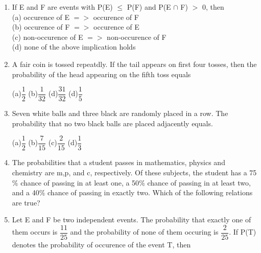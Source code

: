 \documentclass[journal,12pt,twocolumn]{IEEEtran}
\begin{document}
\begin{enumerate}[label=\arabic*]
\begin{itemize}
\begin{multicols}{4}
	\end{multicols}
	\end{itemize}
	\item If E and F are events with P(E) $\leq$ P(F) and P(E $\cap$ F) $>$ 0, then\\
	(a) occurence of E $=>$ occurence of F\\
	(b) occurence of F $=>$ occurence of E\\
	(c) non-occurence of E $=>$ non-occurence of F\\
    (d) none of the above implication holds\\
    \item A fair coin is tossed repeatdly. If the tail appears on first four tosses, then the probability of the head appearing on the fifth toss equals
    \begin{multicols}{4}
    (a)$\dfrac{1}{2}$ (b)$\dfrac{1}{32}$ (d)$\dfrac{31}{32}$  (d)$\dfrac{1}{5}$
    \end{multicols}
    \item Seven white balls and three black are randomly placed in a row. The probability that no two black balls are placed adjacently equals.
    \begin{multicols}{4}
    (a)$\dfrac{1}{2}$  (b)$\dfrac{7}{15}$  (c)$\dfrac{2}{15}$  (d)$\dfrac{1}{3}$
    \end{multicols}
    \item The probabilities that a student passes in mathematics, physics and chemistry are m,p, and c, respectively. Of these subjects, the student has a 75$\%$ chance of passing in at least one, a 50$\%$  chance of passing in at least two, and a 40$\%$  chance of passing in exactly two. Which of the following relations are true?
    \begin{itemize}
    \end{itemize}
    \item Let E and F be two independent events. The probability that exactly one of them occurs is $\dfrac{11}{25}$ and the probability of none of them occuring is $\dfrac{2}{25}$. If P(T) denotes the probability of occurence of the event T, then\\

\end{enumerate}
\end{document}
